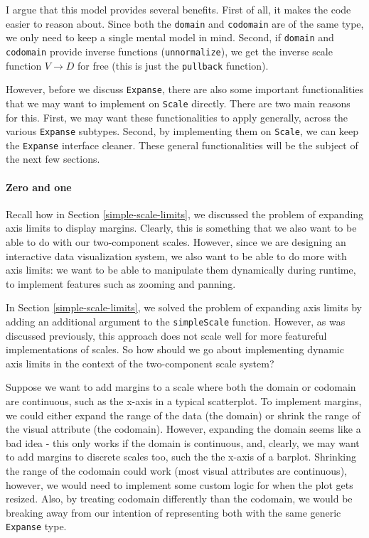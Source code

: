 \documentclass[
]{book}
\theoremstyle{definition}
\theoremstyle{definition}
\theoremstyle{definition}
\theoremstyle{definition}
\theoremstyle{remark}
\begin{document}
I argue that this model provides several benefits. First of all, it makes the code easier to reason about. Since both the \texttt{domain} and \texttt{codomain} are of the same type, we only need to keep a single mental model in mind. Second, if \texttt{domain} and \texttt{codomain} provide inverse functions (\texttt{unnormalize}), we get the inverse scale function \(V \to D\) for free (this is just the \texttt{pullback} function).

However, before we discuss \texttt{Expanse}, there are also some important functionalities that we may want to implement on \texttt{Scale} directly. There are two main reasons for this. First, we may want these functionalities to apply generally, across the various \texttt{Expanse} subtypes. Second, by implementing them on \texttt{Scale}, we can keep the \texttt{Expanse} interface cleaner. These general functionalities will be the subject of the next few sections.

\paragraph{Zero and one}\label{zero-and-one}

Recall how in Section \ref{simple-scale-limits}, we discussed the problem of expanding axis limits to display margins. Clearly, this is something that we also want to be able to do with our two-component scales. However, since we are designing an interactive data visualization system, we also want to be able to do more with axis limits: we want to be able to manipulate them dynamically during runtime, to implement features such as zooming and panning.

In Section \ref{simple-scale-limits}, we solved the problem of expanding axis limits by adding an additional argument to the \texttt{simpleScale} function. However, as was discussed previously, this approach does not scale well for more featureful implementations of scales. So how should we go about implementing dynamic axis limits in the context of the two-component scale system?

Suppose we want to add margins to a scale where both the domain or codomain are continuous, such as the x-axis in a typical scatterplot. To implement margins, we could either expand the range of the data (the domain) or shrink the range of the visual attribute (the codomain). However, expanding the domain seems like a bad idea - this only works if the domain is continuous, and, clearly, we may want to add margins to discrete scales too, such the the x-axis of a barplot. Shrinking the range of the codomain could work (most visual attributes are continuous), however, we would need to implement some custom logic for when the plot gets resized. Also, by treating codomain differently than the codomain, we would be breaking away from our intention of representing both with the same generic \texttt{Expanse} type.
\end{document}
